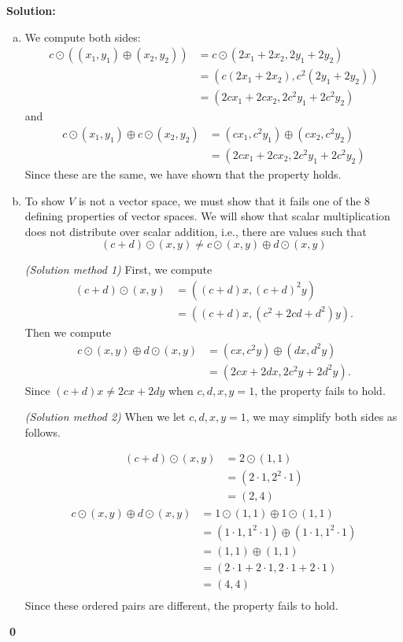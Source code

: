 \documentclass{article}
\newenvironment{solution}
{
  \ignorespaces
  \textbf{Solution:}
}
{
  \ignorespacesafterend
  \begin{flushright}
  {\bfseries \qed}
  \end{flushright}
}
\begin{document}
\begin{solution}
\begin{enumerate}[(a)]
\item
We compute both sides:
\begin{align*}
  c \odot \left((x_1,y_1) \oplus (x_2,y_2) \right)
  &= c \odot (2x_1+2x_2,2y_1+2y_2) \\
  &= (c(2x_1+2x_2),c^2(2y_1+2y_2)) \\
  &= (2cx_1+2cx_2,2c^2y_1+2c^2y_2)
\end{align*}
and
\begin{align*}
  c\odot (x_1,y_1) \oplus c \odot (x_2,y_2) 
  &= (cx_1,c^2y_1) \oplus (cx_2,c^2y_2)\\
  &= (2cx_1+2cx_2,2c^2y_1+2c^2y_2)
\end{align*}
Since these are the same, we have shown that the property holds.
\item

To show \(V\) is not a vector space, we must show that it fails one of the 8 defining properties of vector spaces.
We will show that scalar multiplication does not distribute over scalar addition, i.e., there are values
such that
\[ (c+d)\odot(x,y) \neq c \odot(x,y) \oplus d\odot(x,y) \]

\textit{(Solution method 1)}
First, we compute
\begin{align*}
(c+d)\odot(x,y) &= ((c+d)x,(c+d)^2y) \\
&= ( (c+d)x, (c^2+2cd+d^2)y).
\end{align*}
Then we compute
\begin{align*}
c\odot (x,y) \oplus d\odot(x,y) &= (cx,c^2y) \oplus (dx,d^2y) \\
&= ( 2cx+2dx, 2c^2y+2d^2y).
\end{align*}
Since \((c+d)x\not=2cx+2dy\) when \(c,d,x,y=1\), the property fails to hold.

\textit{(Solution method 2)} When we let \(c,d,x,y=1\), we may simplify both sides as follows.

\begin{align*}
(c+d)\odot(x,y) &= 2\odot(1,1) \\
&= (2\cdot1,2^2\cdot1)\\
&=(2,4)
\end{align*}
\begin{align*}
c\odot (x,y) \oplus d\odot(x,y) &= 1\odot(1,1)\oplus 1\odot(1,1) \\
&= (1\cdot1,1^2\cdot1)\oplus(1\cdot1,1^2\cdot1)\\
&= (1,1)\oplus(1,1)\\
&= (2\cdot1+2\cdot1,2\cdot1+2\cdot1)\\
&= (4,4)\\
\end{align*}
Since these ordered pairs are different, the property fails to hold.
\end{enumerate}
\end{solution}
\end{document}
